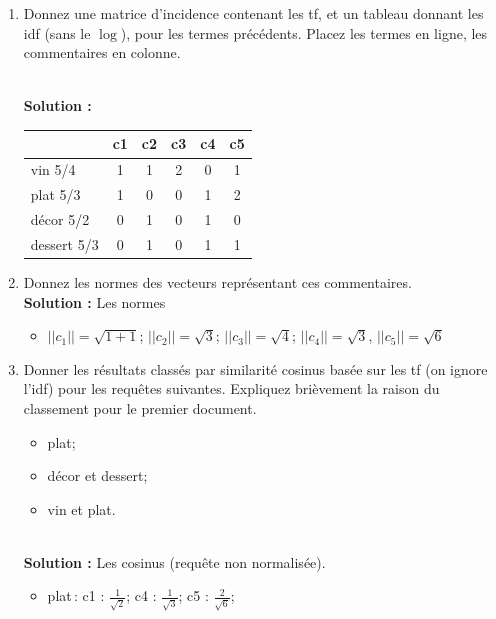 \documentclass[10pt,a4paper]{article}
\newenvironment{solution}[0]{
~\\ \color{red} \textbf{Solution : }\color{black}}{%
}
\begin{document}
\begin{enumerate}
   \item Donnez une matrice d'incidence contenant les tf, 
      et un tableau donnant les idf (sans le $\log$), pour les  termes précédents. Placez
      les termes en ligne, les commentaires en colonne.

\begin{solution}
\begin{center}
\begin{tabular}{l|c|c|c|c|c}
            & \textbf{c1} & \textbf{c2} & \textbf{c3} &\textbf{c4}&\textbf{c5} \\ \hline  
   vin  5/4   & 1           & 1           & 2           & 0         & 1\\
   plat 5/3  & 1           & 0           & 0           & 1         & 2\\
   décor 5/2  & 0           & 1           & 0           & 1         & 0\\
   dessert 5/3  & 0           & 1           & 0           & 1         & 1\\\hline
   \end{tabular}
\end{center}
\end{solution}

  \item Donnez les normes des vecteurs représentant ces commentaires.
\begin{solution}
Les normes
\begin{itemize}
  \item $||c_1|| = \sqrt{1+ 1}$; $||c_2|| = \sqrt{3}$; $||c_3|| = \sqrt{4}$; 
    $||c_4|| = \sqrt{3}$, $||c_5|| = \sqrt{6}$  
\end{itemize}
\end{solution}
  
  \item Donner les résultats classés par similarité cosinus basée sur les tf 
  (on ignore l'idf) pour les requêtes suivantes. Expliquez brièvement la raison
  du classement pour le premier document.
  
  \begin{itemize}
    \item plat;
    \item décor et dessert;
    \item vin et plat.
  \end{itemize}
\begin{solution}
Les cosinus (requête non normalisée).

\begin{itemize}
  \item plat\,: c1 : $\frac{1}{\sqrt{2}}$;  
       c4 : $\frac{1}{\sqrt{3}}$; 
       c5 : $\frac{2}{\sqrt{6}}$; 
  

\end{itemize}
\end{solution}
\end{enumerate}
\end{document}
